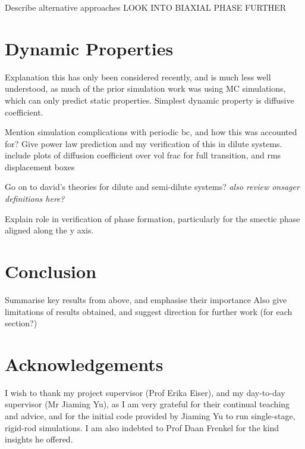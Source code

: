 \documentclass[11pt, a4paper]{article} %
\begin{document}
Describe alternative approaches
LOOK INTO BIAXIAL PHASE FURTHER

\section{Dynamic Properties}
Explanation this has only been considered recently, and is much less well understood, as much of the prior simulation work was using MC simulations, which can only predict static properties.
Simplest dynamic property is diffusive coefficient.

Mention simulation complications with periodic bc, and how this was accounted for?
Give power law prediction and my verification of this in dilute systems.
include plots of diffusion coefficient over vol frac for full transition, and rms displacement boxes

Go on to david's theories for dilute and semi-dilute systems? \textit{also review onsager definitions here?}

Explain role in verification of phase formation, particularly for the smectic phase aligned along the y axis.
\section{Conclusion}
Summarise key results from above, and emphasise their importance 
Also give limitations of results obtained, and suggest direction for further work (for each section?)

\section*{Acknowledgements}
I wish to thank my project supervisor (Prof Erika Eiser), and my day-to-day supervisor (Mr Jiaming Yu), as I am very grateful for their continual teaching and advice, and for the initial code provided by Jiaming Yu to run single-stage, rigid-rod simulations. I am also indebted to Prof Daan Frenkel for the kind insights he offered.

\printbibliography
\end{document}
